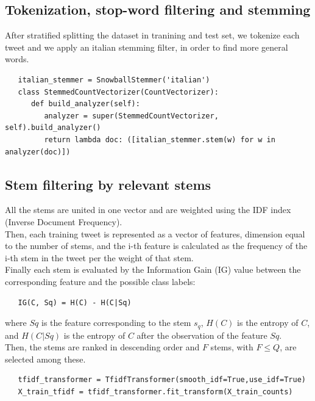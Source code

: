\documentclass[a4paper]{article}
\begin{document}
\subsection{Tokenization, stop-word filtering and stemming}
After stratified splitting the dataset in tranining and test set, we tokenize each tweet and we apply an italian stemming filter, in order to find more general words.
\begin{verbatim}
   italian_stemmer = SnowballStemmer('italian')
   class StemmedCountVectorizer(CountVectorizer):
      def build_analyzer(self):
         analyzer = super(StemmedCountVectorizer, self).build_analyzer()
         return lambda doc: ([italian_stemmer.stem(w) for w in analyzer(doc)])
\end{verbatim}

\subsection{Stem filtering by relevant stems}
All the stems are united in one vector and are weighted using the IDF index (Inverse Document Frequency).\\
Then, each training tweet is represented as a vector of features, dimension equal to the number of stems, and the i-th feature is calculated as the frequency of the i-th stem in the tweet per the weight of that stem.\\
Finally each stem is evaluated by the Information Gain (IG) value between the corresponding feature and the possible class labels:
\begin{verbatim}
   IG(C, Sq) = H(C) - H(C|Sq)
\end{verbatim}
where $Sq$ is the feature corresponding to the stem $s_q$, $H(C)$ is the entropy of $C$, and $H(C|Sq)$ is the entropy of $C$ after the observation of the feature $Sq$.\\
Then, the stems are ranked in descending order and $F$ stems, with $F \leq Q$, are selected among these.
\begin{verbatim}
   tfidf_transformer = TfidfTransformer(smooth_idf=True,use_idf=True)
   X_train_tfidf = tfidf_transformer.fit_transform(X_train_counts)
\end{verbatim}
\clearpage
\end{document}
